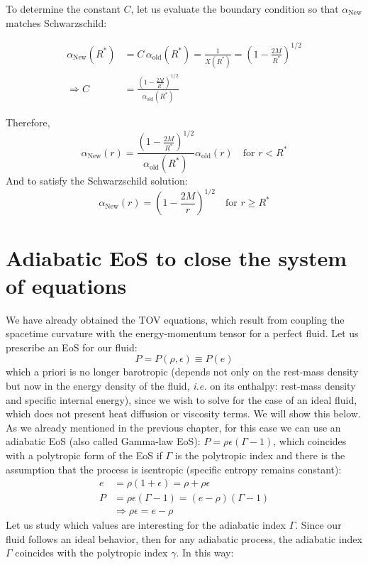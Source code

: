 \documentclass[12pt]{report}
\begin{document}
	To determine the constant $C$, let us evaluate the boundary condition so that $\alpha_{\text{New}}$ matches Schwarzschild:
	
	\begin{align*}
		\alpha_{\text{New}}(R^*) &= C\, \alpha_{\text{old}}(R^*) = \frac{1}{X(R^*)} = \left(1-\frac{2M}{R^*}\right)^{1/2} \\
		\Rightarrow C &= \frac{\left(1-\frac{2M}{R^*}\right)^{1/2}}{\alpha_{\text{old}}(R^*)}
	\end{align*}
	
	Therefore,
	\begin{equation}
		\boxed{\alpha_{\text{New}}(r) = \frac{\left(1-\frac{2M}{R^*}\right)^{1/2}}{\alpha_{\text{old}}(R^*)} \alpha_{\text{old}}(r) \quad \text{for } r < R^*}   
	\end{equation}
	And to satisfy the Schwarzschild solution:
	\begin{equation}
		\boxed{\alpha_{\text{New}}(r) = \left(1-\frac{2M}{r}\right)^{1/2} \quad \text{for } r \geq R^*}
	\end{equation}
	\section{Adiabatic EoS to close the system of equations}
	We have already obtained the TOV equations, which result from coupling the spacetime curvature with the energy-momentum tensor for a perfect fluid. Let us prescribe an EoS for our fluid:
	\begin{equation}P = P(\rho, \epsilon) \equiv P(e)\end{equation}
	which a priori is no longer barotropic (depends not only on the rest-mass density but now in the energy density of the fluid, \textit{i.e.} on its enthalpy: rest-mass density and specific internal energy), since we wish to solve for the case of an ideal fluid, which does not present heat diffusion or viscosity terms. We will show this below. As we already mentioned in the previous chapter, for this case we can use an adiabatic EoS (also called Gamma-law EoS): $P=\rho\epsilon(\Gamma-1)$, which coincides with a polytropic form of the EoS if $\Gamma$ is the polytropic index and there is the assumption that the process is isentropic (specific entropy remains constant):
	\begin{align*}
		e &= \rho(1+\epsilon)=\rho + \rho \epsilon \\
		P &= \rho \epsilon(\Gamma-1) = (e-\rho)(\Gamma-1) \\
		&\Rightarrow \rho \epsilon = e-\rho
	\end{align*}
	Let us study which values are interesting for the adiabatic index $\Gamma$. Since our fluid follows an ideal behavior, then for any adiabatic process, the adiabatic index $\Gamma$ coincides with the polytropic index $\gamma$. In this way:
	
\end{document}
